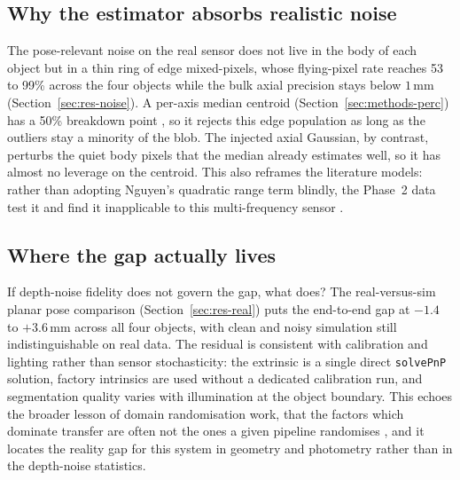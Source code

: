 \subsection{Why the estimator absorbs realistic noise}
The pose-relevant noise on the real sensor does not live in the body of each object but in
a thin ring of edge mixed-pixels, whose flying-pixel rate reaches 53 to 99\% across the
four objects while the bulk axial precision stays below $1$\,mm
(Section~\ref{sec:res-noise}). A per-axis median centroid (Section~\ref{sec:methods-perc})
has a 50\% breakdown point \cite{huber1981robust}, so it rejects this edge population as
long as the outliers stay a minority of the blob. The injected axial Gaussian, by contrast,
perturbs the quiet body pixels that the median already estimates well, so it has almost no
leverage on the centroid. This also reframes the literature models: rather than adopting
Nguyen's quadratic range term blindly, the Phase~2 data test it and find it inapplicable to
this multi-frequency sensor \cite{nguyen2012modeling}.

\subsection{Where the gap actually lives}
If depth-noise fidelity does not govern the gap, what does? The real-versus-sim planar pose
comparison (Section~\ref{sec:res-real}) puts the end-to-end gap at $-1.4$ to $+3.6$\,mm
across all four objects, with clean and noisy simulation still indistinguishable on real
data. The residual is consistent with calibration and lighting rather than sensor
stochasticity: the extrinsic is a single direct \texttt{solvePnP} solution, factory
intrinsics are used without a dedicated calibration run, and segmentation quality varies
with illumination at the object boundary. This echoes the broader lesson of domain
randomisation work, that the factors which dominate transfer are often not the ones a given
pipeline randomises \cite{tobin2017domain}, and it locates the reality gap
\cite{jakobi1995noise} for this system in geometry and photometry rather than in the
depth-noise statistics.

